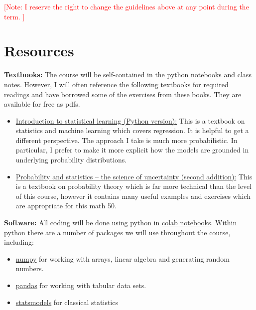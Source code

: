 \noindent
\textcolor{red}{[Note: I reserve the right to change the guidelines above at any point during the term. ]}


\section*{Resources}

\noindent
{\bf Textbooks:} The course will be self-contained in the python notebooks and class notes. However, I will often reference the following textbooks for required readings and have borrowed some of the exercises from these books. They are available for free as pdfs. 
\begin{itemize}
\item \href{https://hastie.su.domains/ISLP/ISLP_website.pdf}{Introduction to statistical learning (Python version):} This is a textbook on statistics and machine learning which covers regression. It is helpful to get a different perspective. The approach I take is much more probabilistic. In particular, I prefer to make it more explicit how the models are grounded in underlying probability distributions. 
\item \href{https://www.utstat.toronto.edu/mikevans/jeffrosenthal/}{Probability and statistics -- the science of uncertainty (second addition):} This is a textbook on probability theory which is far more technical than the level of this course, however it contains many useful examples and exercises which are appropriate for this math 50.\\
\end{itemize}

\noindent
{\bf Software:} 
All coding will be done using python in \href{https://colab.research.google.com/}{colab notebooks}. Within python there are a number of packages we will use throughout the course, including:
\begin{itemize}
\item \href{https://numpy.org/}{numpy} for working with arrays, linear algebra and generating random numbers.
\item \href{https://pandas.pydata.org/}{pandas} for working with tabular data sets.
\item \href{https://www.statsmodels.org/stable/index.html}{statsmodels} for classical statistics
\end{itemize}


